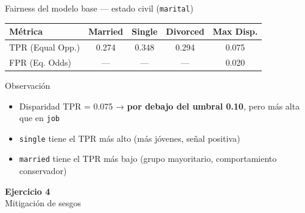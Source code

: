 \documentclass[aspectratio=169, 11pt]{beamer}
\begin{document}
\begin{frame}{Fairness del modelo base — estado civil (\texttt{marital})}
\begin{center}
\begin{tabular}{l c c c c}
\toprule
\textbf{Métrica} & \textbf{Married} & \textbf{Single} & \textbf{Divorced} & \textbf{Max Disp.} \\
\midrule
\rowcolor{gris10} TPR (Equal Opp.) & 0.274 & 0.348 & 0.294 & 0.075 \\
FPR (Eq. Odds) & --- & --- & --- & 0.020 \\
\bottomrule
\end{tabular}
\end{center}
\vspace{6pt}
\begin{block}{Observación}
\begin{itemize}
\item Disparidad TPR = 0.075 → \textbf{por debajo del umbral 0.10}, pero más alta que en \texttt{job}
\item \texttt{single} tiene el TPR más alto (más jóvenes, señal positiva)
\item \texttt{married} tiene el TPR más bajo (grupo mayoritario, comportamiento conservador)
\end{itemize}
\end{block}
\end{frame}

{
\begin{frame}[plain]
\vfill
\begin{center}
{\color{white}\LARGE\bfseries Ejercicio 4}\\[8pt]
{\color{azulclaro}\large Mitigación de sesgos}
\end{center}
\vfill
\end{frame}
}
\end{document}
